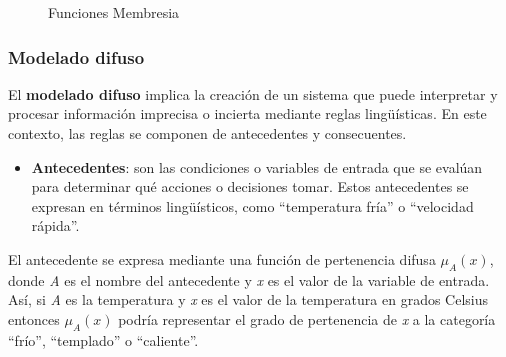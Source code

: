 \documentclass[
  a4paper,
  DIV=11,
  numbers=noendperiod]{scrreprt}
\providecommand{\tightlist}{%
  \setlength{\itemsep}{0pt}\setlength{\parskip}{0pt}}\usepackage{longtable,booktabs,array}
\begin{document}
\begin{figure}


\caption{\label{fig-funciones_membresia}Funciones Membresia}

\end{figure}%

\subsubsection{Modelado difuso}\label{modelado-difuso}

El \textbf{modelado difuso} implica la creación de un sistema que puede
interpretar y procesar información imprecisa o incierta mediante reglas
lingüísticas. En este contexto, las reglas se componen de antecedentes y
consecuentes.

\begin{itemize}
\tightlist
\item
  \textbf{Antecedentes}: son las condiciones o variables de entrada que
  se evalúan para determinar qué acciones o decisiones tomar. Estos
  antecedentes se expresan en términos lingüísticos, como ``temperatura
  fría'' o ``velocidad rápida''.
\end{itemize}

El antecedente se expresa mediante una función de pertenencia difusa
\(\mu_A(x)\), donde \emph{A} es el nombre del antecedente y \emph{x} es
el valor de la variable de entrada. Así, si \emph{A} es la temperatura y
\emph{x} es el valor de la temperatura en grados Celsius entonces
\(\mu_A(x)\) podría representar el grado de pertenencia de \emph{x} a la
categoría ``frío'', ``templado'' o ``caliente''.
\end{document}
